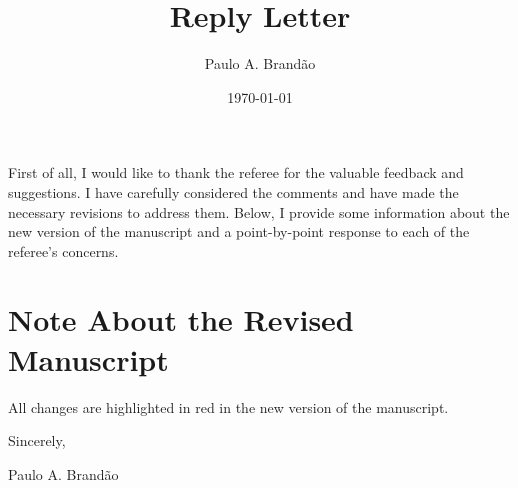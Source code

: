\documentclass{article}
\begin{document}
\title{Reply Letter}
\author{Paulo A. Brand\~ao}
\date{\today}

\maketitle

First of all, I would like to thank the referee for the valuable feedback and suggestions. I have carefully considered the comments and have made the necessary revisions to address them. Below, I provide some information about the new version of the manuscript and a point-by-point response to each of the referee's concerns.

\section*{Note About the Revised Manuscript}

All changes are highlighted in red in the new version of the manuscript. 




\vspace{5cm}

Sincerely,

Paulo A. Brand\~ao
\end{document}

